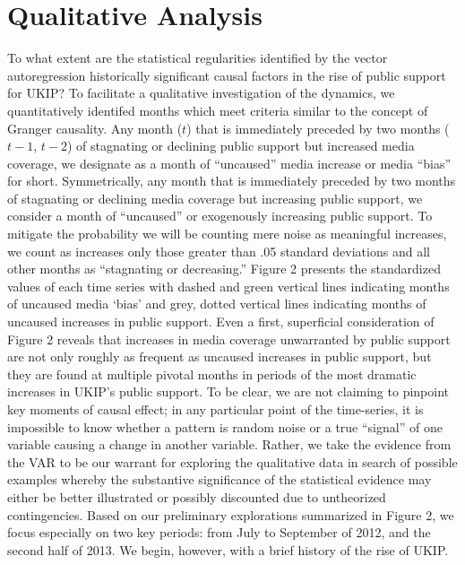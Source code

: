 \documentclass[12pt,article]{article}
\begin{document}
\section{Qualitative Analysis}\label{qualitative-analysis}

To what extent are the statistical regularities identified by the vector
autoregression historically significant causal factors in the rise of
public support for UKIP? To facilitate a qualitative investigation of
the dynamics, we quantitatively identifed months which meet criteria
similar to the concept of Granger causality. Any month (\(t\)) that is
immediately preceded by two months (\(t-1\), \(t-2\)) of stagnating or
declining public support but increased media coverage, we designate as a
month of ``uncaused'' media increase or media ``bias'' for short.
Symmetrically, any month that is immediately preceded by two months of
stagnating or declining media coverage but increasing public support, we
consider a month of ``uncaused'' or exogenously increasing public
support. To mitigate the probability we will be counting mere noise as
meaningful increases, we count as increases only those greater than .05
standard deviations and all other months as ``stagnating or
decreasing.'' Figure 2 presents the standardized values of each time
series with dashed and green vertical lines indicating months of
uncaused media `bias' and grey, dotted vertical lines indicating months
of uncaused increases in public support. Even a first, superficial
consideration of Figure 2 reveals that increases in media coverage
unwarranted by public support are not only roughly as frequent as
uncaused increases in public support, but they are found at multiple
pivotal months in periods of the most dramatic increases in UKIP's
public support. To be clear, we are not claiming to pinpoint key moments
of causal effect; in any particular point of the time-series, it is
impossible to know whether a pattern is random noise or a true
``signal'' of one variable causing a change in another variable. Rather,
we take the evidence from the VAR to be our warrant for exploring the
qualitative data in search of possible examples whereby the substantive
significance of the statistical evidence may either be better
illustrated or possibly discounted due to untheorized contingencies.
Based on our preliminary explorations summarized in Figure 2, we focus
especially on two key periods: from July to September of 2012, and the
second half of 2013. We begin, however, with a brief history of the rise
of UKIP.
\end{document}
